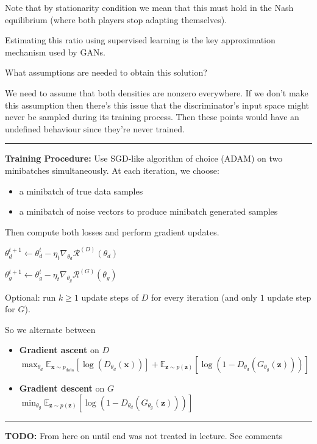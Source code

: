 \documentclass[a2paper,4pt]{extarticle}
\newcommand{\cR}{\mathcal{R}}
\newcommand{\Exp}[2][]{{\mathbb{E}_{#1}}\left[ #2
\right]}
\renewcommand{\vec}[1]{\mathbf{#1}}
\newcommand{\vx}{\vec{x}}
\newcommand{\vz}{\vec{z}}
\newcommand{\todo}[1]{\textbf{TODO:} #1}
\newcommand{\todo}[1]{%
}
\newcommand{\sep}{\vspace{0pt}\noindent\hrule\vspace{0pt}}
\newcommand{\sep}{\vspace{5pt}\noindent\hrule\vspace{5pt}}
\begin{document}
\begin{landscape}
\begin{multicols*}{7}
Note that by stationarity condition we mean that this must hold in the
Nash equilibrium (where both players stop adapting themselves).

Estimating this ratio using supervised learning is the key approximation
mechanism used by GANs.



What assumptions are needed to obtain this solution?

We need to assume that both densities are nonzero everywhere. If we don't make
this assumption then there's this issue that the discriminator's input space
might never be sampled during its training process. Then these points would have
an undefined behaviour since they're never trained.

\sep

\textbf{Training Procedure:} Use SGD-like algorithm of choice (ADAM) on two
minibatches simultaneously. At each iteration, we choose:
\begin{itemize}
  \item a minibatch of true data samples
  \item a minibatch of noise vectors to produce minibatch generated samples
\end{itemize}
Then compute both losses and perform gradient updates.

$\theta_d^{t+1}\gets\theta_d^t-\eta_t\nabla_{\theta_d}\cR^{(D)}(\theta_d)$

$\theta_g^{t+1}\gets\theta_g^t-\eta_t\nabla_{\theta_g}\cR^{(G)}(\theta_g)$

Optional: run $k\geq 1$ update steps of $D$ for every iteration (and only
$1$ update step for $G$).

So we alternate between
\begin{itemize}
  \item \textbf{Gradient ascent} on $D$\\
  $
\max_{\theta_d}
\Exp[\vx\sim p_{\text{data}}]{\log(D_{\theta_d}(\vx))}
+
\Exp[\vz\sim p(\vz)]{\log(1-D_{\theta_d}(G_{\theta_g}(\vz)))}
  $
  \item \textbf{Gradient descent} on $G$\\
  $
\min_{\theta_g}
\Exp[\vz\sim p(\vz)]{\log(1-D_{\theta_d}(G_{\theta_g}(\vz)))}
  $
\end{itemize}
\sep

\todo{From here on until end was not treated in lecture. See comments}

\end{multicols*}
\end{landscape}
\end{document}
